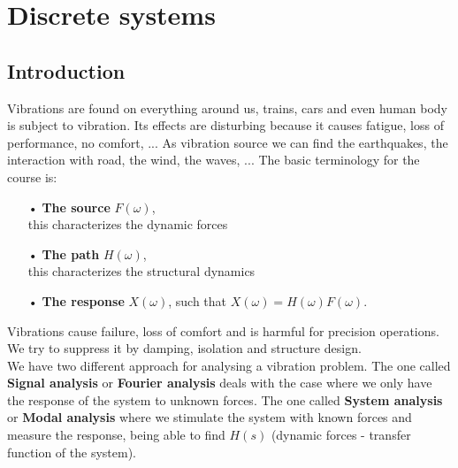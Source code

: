 
\chapter{Discrete systems}
	\section{Introduction}
		Vibrations are found on everything around us, trains, cars and even human body is subject to vibration. Its effects are disturbing because it causes fatigue, loss of performance, no comfort, ... As vibration source we can find the earthquakes, the interaction with road, the wind, the waves, ... The basic terminology for the course is:
		
		\begin{multicols}{3}
		\begin{itemize}
		\item[•] \textbf{The source} $F(\omega)$,\\
		this characterizes the dynamic forces
		\item[•] \textbf{The path} $H(\omega)$,\\
		this characterizes the structural dynamics
		\item[•] \textbf{The response} $X(\omega)$,
		such that $X(\omega)=H(\omega)F(\omega)$.
		\end{itemize}
		\end{multicols}
		
		Vibrations cause failure, loss of comfort and is harmful for precision operations. We try to suppress it by damping, isolation and structure design.\\
		
		We have two different approach for analysing a vibration problem. The one called \textbf{Signal analysis} or \textbf{Fourier analysis} deals with the case where we only have the response of the system to unknown forces. The one called \textbf{System analysis} or \textbf{Modal analysis} where we stimulate the system with known forces and measure the response, being able to find $H(s)$ (dynamic forces - transfer function of the system). \\
		
